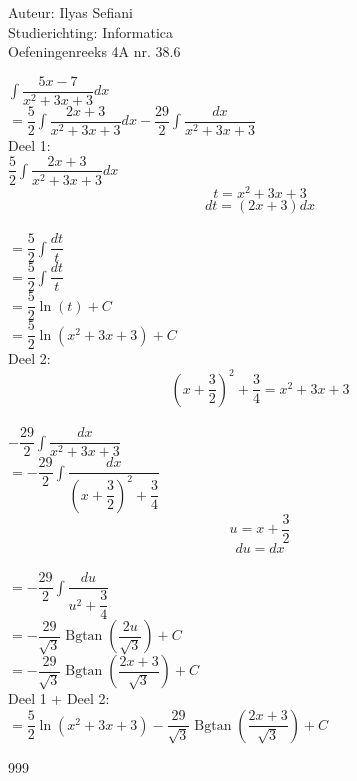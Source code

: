 \documentclass[a4paper]{article}
\begin{document}
\noindent \large Auteur: Ilyas Sefiani \\
\noindent \large Studierichting: Informatica\\
\noindent \large Oefeningenreeks 4A nr. 38.6\\

\medskip

\normalsize

$\displaystyle\int \dfrac{5x-7}{x^2+3x+3}dx$\\

$= \dfrac{5}{2}\displaystyle\int \dfrac{2x+3}{x^2+3x+3}dx-\dfrac{29}{2}\displaystyle\int \dfrac{dx}{x^2+3x+3}$\\

Deel 1:\\

$\dfrac{5}{2}\displaystyle\int \dfrac{2x+3}{x^2+3x+3}dx$\\

$$t=x^2+3x+3$$ $$dt=(2x+3)dx$$\\

$=\dfrac{5}{2}\displaystyle\int \dfrac{dt}{t}$\\

$=\dfrac{5}{2}\displaystyle\int \dfrac{dt}{t}$\\

$=\dfrac{5}{2} \ln(t)+C$\\

$=\dfrac{5}{2} \ln(x^2+3x+3)+C$\\

Deel 2:\\

$$\left(x+\dfrac{3}{2}\right)^2+\dfrac{3}{4}=x^2+3x+3$$\\

$-\dfrac{29}{2}\displaystyle\int \dfrac{dx}{x^2+3x+3}$\\

$= -\dfrac{29}{2}\displaystyle\int \dfrac{dx}{\left(x+\dfrac{3}{2}\right)^2+\dfrac{3}{4}}$\\

$$u=x+\dfrac{3}{2}$$ $$du=dx$$\\

$= -\dfrac{29}{2}\displaystyle\int \dfrac{du}{u^2+\dfrac{3}{4}}$\\

$= -\dfrac{29}{\sqrt{3}}\operatorname{Bgtan}\left(\dfrac{2u}{\sqrt{3}}\right)+C$\\

$= -\dfrac{29}{\sqrt{3}}\operatorname{Bgtan}\left(\dfrac{2x+3}{\sqrt{3}}\right)+C$\\

Deel 1 + Deel 2:\\

$=\dfrac{5}{2} \ln(x^2+3x+3)-\dfrac{29}{\sqrt{3}}\operatorname{Bgtan}\left(\dfrac{2x+3}{\sqrt{3}}\right)+C$\\

\begin{thebibliography}{999}
\end{thebibliography}
\end{document}
